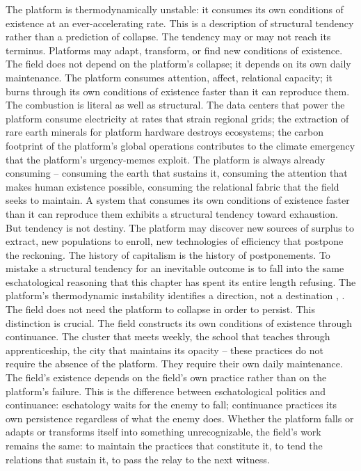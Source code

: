 The platform is thermodynamically unstable: it consumes its own conditions of existence at an ever-accelerating rate. This is a description of structural tendency rather than a prediction of collapse. The tendency may or may not reach its terminus. Platforms may adapt, transform, or find new conditions of existence. The field does not depend on the platform’s collapse; it depends on its own daily maintenance. The platform consumes attention, affect, relational capacity; it burns through its own conditions of existence faster than it can reproduce them. The combustion is literal as well as structural. The data centers that power the platform consume electricity at rates that strain regional grids; the extraction of rare earth minerals for platform hardware destroys ecosystems; the carbon footprint of the platform’s global operations contributes to the climate emergency that the platform’s urgency-memes exploit. The platform is always already consuming – consuming the earth that sustains it, consuming the attention that makes human existence possible, consuming the relational fabric that the field seeks to maintain. A system that consumes its own conditions of existence faster than it can reproduce them exhibits a structural tendency toward exhaustion. But tendency is not destiny. The platform may discover new sources of surplus to extract, new populations to enroll, new technologies of efficiency that postpone the reckoning. The history of capitalism is the history of postponements. To mistake a structural tendency for an inevitable outcome is to fall into the same eschatological reasoning that this chapter has spent its entire length refusing. The platform’s thermodynamic instability identifies a direction, not a destination \cite{stiegler_2010}, \cite{crawford_2021}. The field does not need the platform to collapse in order to persist. This distinction is crucial. The field constructs its own conditions of existence through continuance. The cluster that meets weekly, the school that teaches through apprenticeship, the city that maintains its opacity – these practices do not require the absence of the platform. They require their own daily maintenance. The field’s existence depends on the field’s own practice rather than on the platform’s failure. This is the difference between eschatological politics and continuance: eschatology waits for the enemy to fall; continuance practices its own persistence regardless of what the enemy does. Whether the platform falls or adapts or transforms itself into something unrecognizable, the field’s work remains the same: to maintain the practices that constitute it, to tend the relations that sustain it, to pass the relay to the next witness.

